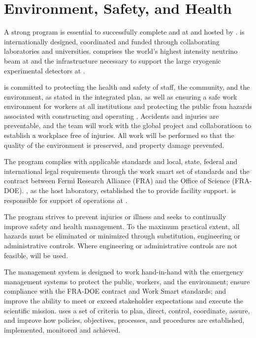\chapter{Environment, Safety, and Health}
\label{vl:tc-ESH}


A strong  program is essential to successfully complete
 and  at  and hosted by \fnal.
 is internationally designed, coordinated and funded
through collaborating laboratories and universities.  
comprises the world's highest intensity neutrino beam at \fnal and the
infrastructure necessary to support the large cryogenic experimental
detectors at .

 is committed to protecting the health and safety of
staff, the community, and the environment, as stated in the
 integrated  plan, as well as ensuring a
safe work environment for  workers at all institutions and
protecting the public from hazards associated with constructing and
operating . Accidents and injuries are preventable, and
the  team will work with the global 
project and collaboratioon to establish a workplace free of injuries.
All work will be performed so that the quality of the environment is
preserved, and property damage prevented.

The   program complies with applicable
standards and local, state, federal and international legal
requirements through the \fnal work smart set of standards and the
contract between Fermi Research Alliance (FRA) and the 
Office of Science (FRA-DOE). \fnal, as the host laboratory,
established the  to provide facility support.
 is responsible for support of 
operations at .

The   program strives to prevent
injuries or illness and seeks to continually improve safety and health
management.  To the maximum practical extent, all hazards must be
eliminated or minimized through substitution, engineering or
administrative controls.  Where engineering or administrative controls
are not feasible,  will be used.

The   management system is
designed to work hand-in-hand with the  emergency
management systems to protect the public, workers, and the environment;
ensure compliance with the FRA-DOE contract and \fnal Work Smart
standards; and improve the  ability to meet or
exceed stakeholder expectations and execute the
scientific mission.   uses a set of criteria to plan, direct,
control, coordinate, assure, and improve how  policies,
objectives, processes, and procedures are established, implemented,
monitored and achieved.

